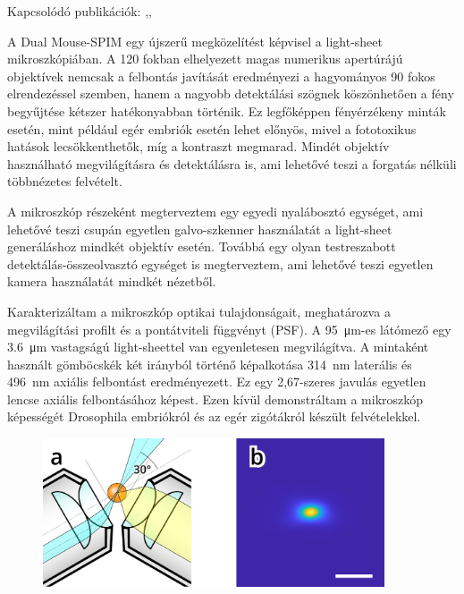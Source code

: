 \documentclass{booklet_style}
\begin{document}
    Kapcsolódó publikációk: \cite{de_medeiros_light-sheet_2016},\cite{strnad_inverted_2016}, \cite{hoyer_breaking_2016}

    A Dual Mouse-SPIM egy újszerű megközelítést képvisel a light-sheet mikroszkópiában. A 120 fokban elhelyezett magas numerikus apertúrájú objektívek nemcsak a felbontás javítását eredményezi a hagyományos 90 fokos elrendezéssel szemben, hanem a nagyobb detektálási szögnek köszönhetően a fény begyűjtése kétszer hatékonyabban történik. Ez legfőképpen fényérzékeny minták esetén, mint például egér embriók esetén lehet előnyös, mivel a fototoxikus hatások lecsökkenthetők, míg a kontraszt megmarad. Mindét objektív használható megvilágításra és detektálásra is, ami lehetővé teszi a forgatás nélküli többnézetes felvételt.

    A mikroszkóp részeként megterveztem egy egyedi nyalábosztó egységet, ami lehetővé teszi csupán egyetlen galvo-szkenner használatát a light-sheet generáláshoz mindkét objektív esetén. Továbbá egy olyan testreszabott detektálás-összeolvasztó egységet is megterveztem, ami lehetővé teszi egyetlen kamera használatát mindkét nézetből.

    Karakterizáltam a mikroszkóp optikai tulajdonságait, meghatározva a megvilágítási profilt és a pontátviteli függvényt (PSF).
    A \SI{95}{\micro m}-es látómező egy \SI{3,6}{\micro m} vastagságú light-sheettel van egyenletesen megvilágítva. A mintaként használt gömböcskék két irányból történő képalkotása \SI{314}{nm} laterális és \SI{496}{nm} axiális felbontást eredményezett. Ez egy 2,67-szeres javulás egyetlen lencse axiális felbontásához képest. Ezen kívül demonstráltam a  mikroszkóp képességét Drosophila embriókról és az egér zigótákról készült felvételekkel. 
    

    \begin{figure}
      \centering
      \includegraphics[width=0.9\textwidth]{2_DualMouse/120+psf}
      \label{fig:DualMouse}
    \end{figure}
\end{document}
